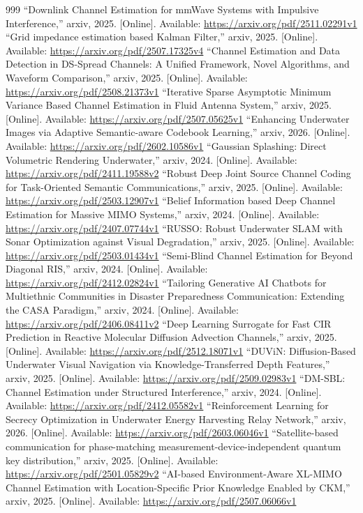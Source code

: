 \documentclass[10pt,journal]{IEEEtran}
\begin{document}
\begin{thebibliography}{999}
 ``Downlink Channel Estimation for mmWave Systems with Impulsive Interference,'' arxiv, 2025. [Online]. Available: \url{https://arxiv.org/pdf/2511.02291v1}
 ``Grid impedance estimation based Kalman Filter,'' arxiv, 2025. [Online]. Available: \url{https://arxiv.org/pdf/2507.17325v4}
 ``Channel Estimation and Data Detection in DS-Spread Channels: A Unified Framework, Novel Algorithms, and Waveform Comparison,'' arxiv, 2025. [Online]. Available: \url{https://arxiv.org/pdf/2508.21373v1}
 ``Iterative Sparse Asymptotic Minimum Variance Based Channel Estimation in Fluid Antenna System,'' arxiv, 2025. [Online]. Available: \url{https://arxiv.org/pdf/2507.05625v1}
 ``Enhancing Underwater Images via Adaptive Semantic-aware Codebook Learning,'' arxiv, 2026. [Online]. Available: \url{https://arxiv.org/pdf/2602.10586v1}
 ``Gaussian Splashing: Direct Volumetric Rendering Underwater,'' arxiv, 2024. [Online]. Available: \url{https://arxiv.org/pdf/2411.19588v2}
 ``Robust Deep Joint Source Channel Coding for Task-Oriented Semantic Communications,'' arxiv, 2025. [Online]. Available: \url{https://arxiv.org/pdf/2503.12907v1}
 ``Belief Information based Deep Channel Estimation for Massive MIMO Systems,'' arxiv, 2024. [Online]. Available: \url{https://arxiv.org/pdf/2407.07744v1}
 ``RUSSO: Robust Underwater SLAM with Sonar Optimization against Visual Degradation,'' arxiv, 2025. [Online]. Available: \url{https://arxiv.org/pdf/2503.01434v1}
 ``Semi-Blind Channel Estimation for Beyond Diagonal RIS,'' arxiv, 2024. [Online]. Available: \url{https://arxiv.org/pdf/2412.02824v1}
 ``Tailoring Generative AI Chatbots for Multiethnic Communities in Disaster Preparedness Communication: Extending the CASA Paradigm,'' arxiv, 2024. [Online]. Available: \url{https://arxiv.org/pdf/2406.08411v2}
 ``Deep Learning Surrogate for Fast CIR Prediction in Reactive Molecular Diffusion Advection Channels,'' arxiv, 2025. [Online]. Available: \url{https://arxiv.org/pdf/2512.18071v1}
 ``DUViN: Diffusion-Based Underwater Visual Navigation via Knowledge-Transferred Depth Features,'' arxiv, 2025. [Online]. Available: \url{https://arxiv.org/pdf/2509.02983v1}
 ``DM-SBL: Channel Estimation under Structured Interference,'' arxiv, 2024. [Online]. Available: \url{https://arxiv.org/pdf/2412.05582v1}
 ``Reinforcement Learning for Secrecy Optimization in Underwater Energy Harvesting Relay Network,'' arxiv, 2026. [Online]. Available: \url{https://arxiv.org/pdf/2603.06046v1}
 ``Satellite-based communication for phase-matching measurement-device-independent quantum key distribution,'' arxiv, 2025. [Online]. Available: \url{https://arxiv.org/pdf/2501.05829v2}
 ``AI-based Environment-Aware XL-MIMO Channel Estimation with Location-Specific Prior Knowledge Enabled by CKM,'' arxiv, 2025. [Online]. Available: \url{https://arxiv.org/pdf/2507.06066v1}
\end{thebibliography}
\end{document}
